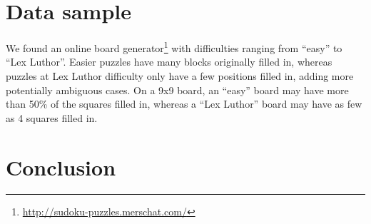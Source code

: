 \documentclass[conference,final]{IEEEtran}
\begin{document}
\section{Data sample}
We found an online board
generator\footnote{\url{http://sudoku-puzzles.merschat.com/}} with difficulties
ranging from ``easy'' to ``Lex Luthor''. Easier puzzles have many blocks
originally filled in, whereas puzzles at Lex Luthor difficulty only have a few
positions filled in, adding more potentially ambiguous cases. On a 9x9 board,
an ``easy'' board may have more than 50\% of the squares filled in, whereas a
``Lex Luthor'' board may have as few as 4 squares filled in.



\section{Conclusion}
\end{document}
